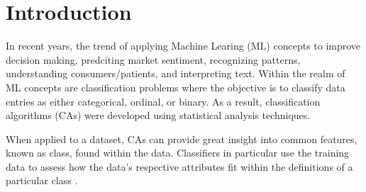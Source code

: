 \section{Introduction}
\label{sec:Introduction}

In recent years, the trend of applying Machine Learing (ML) concepts to improve decision making, predciting 
market sentiment, recognizing patterns, understanding consumers/patients, and interpreting text. 
Within the realm of ML concepts are classification problems where the objective is to classify data entries 
as either categorical, ordinal, or binary. 
As a result, classification algorithms (CAs) were developed using statistical analysis techniques. 

When applied to a dataset, CAs can provide great insight into common features, known as class,
found within the data. Classifiers in particular use the training data to assess how the data's respective 
attributes fit within the definitions of a particular class \cite{class}. 

